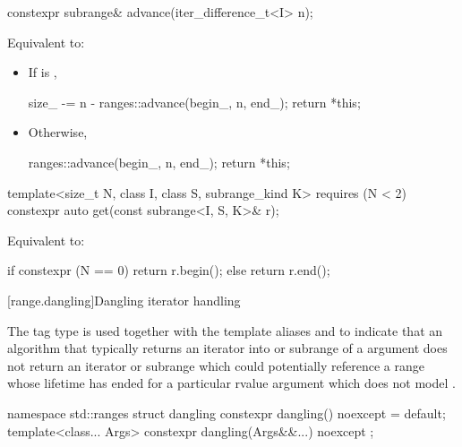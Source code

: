 %
\begin{itemdecl}
constexpr subrange& advance(iter_difference_t<I> n);
\end{itemdecl}

\begin{itemdescr}
\pnum
\effects Equivalent to:
\begin{itemize}
\item If  is ,
\begin{codeblock}
size_ -= n - ranges::advance(begin_, n, end_);
return *this;
\end{codeblock}
\item Otherwise,
\begin{codeblock}
ranges::advance(begin_, n, end_);
return *this;
\end{codeblock}
\end{itemize}
\end{itemdescr}

%
\begin{itemdecl}
template<size_t N, class I, class S, subrange_kind K>
  requires (N < 2)
constexpr auto get(const subrange<I, S, K>& r);
\end{itemdecl}

\begin{itemdescr}
\pnum
\effects Equivalent to:
\begin{codeblock}
if constexpr (N == 0)
  return r.begin();
else
  return r.end();
\end{codeblock}
\end{itemdescr}

[range.dangling]{Dangling iterator handling}

\pnum
The tag type  is used together
with the template aliases  and 
to indicate that an algorithm
that typically returns an iterator into or subrange of a  argument
does not return an iterator or subrange
which could potentially reference a range
whose lifetime has ended for a particular rvalue  argument
which does not model .
\begin{codeblock}
namespace std::ranges {
  struct dangling {
    constexpr dangling() noexcept = default;
    template<class... Args>
      constexpr dangling(Args&&...) noexcept { }
  };
}
\end{codeblock}

